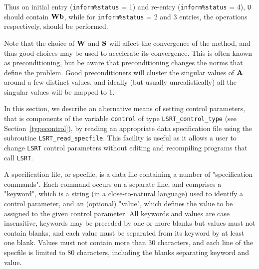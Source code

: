 \documentclass{galahad}
\newcommand{\packagename}{LS\-RT}
\begin{document}
Thus on initial entry ({\tt inform\%status} = 1) and re-entry
({\tt inform\%status} = 4), {\tt U} should contain ${\mathbf{W}} {\mathbf{b}}$,
while for {\tt inform\%status} = 2 and 3 entries, the operations
respectively, should be performed.

Note that the choice of ${\mathbf{W}}$ and ${\mathbf{S}}$ will affect the convergence of the
method, and thus good choices may be used to accelerate its convergence. This
is often known as preconditioning, but be aware that preconditioning changes
the norms that define the problem. Good preconditioners will cluster 
the singular values of $\bar{{\mathbf{A}}}$ around a few distinct values, and ideally
(but usually unrealistically) all the singular values will be mapped to 1.




\galfeatures
\noindent In this section, we describe an alternative means of setting 
control parameters, that is components of the variable {\tt control} of type
{\tt \packagename\_control\_type}
(see Section~\ref{typecontrol}), 
by reading an appropriate data specification file using the
subroutine {\tt \packagename\_read\_specfile}. This facility
is useful as it allows a user to change  {\tt \packagename} control parameters 
without editing and recompiling programs that call {\tt \packagename}.

A specification file, or specfile, is a data file containing a number of 
"specification commands". Each command occurs on a separate line, 
and comprises a "keyword", 
which is a string (in a close-to-natural language) used to identify a 
control parameter, and 
an (optional) "value", which defines the value to be assigned to the given
control parameter. All keywords and values are case insensitive, 
keywords may be preceded by one or more blanks but
values must not contain blanks, and
each value must be separated from its keyword by at least one blank.
Values must not contain more than 30 characters, and 
each line of the specfile is limited to 80 characters,
including the blanks separating keyword and value.
\end{document}
